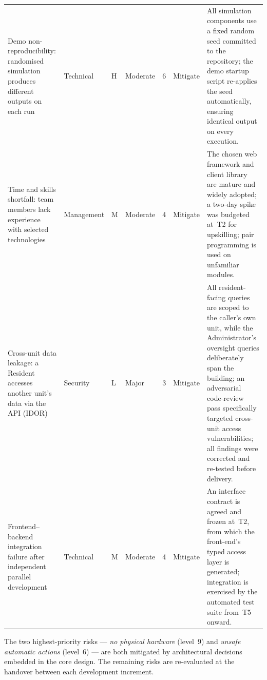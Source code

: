\begin{longtable}{@{} p{2.5cm} p{1.4cm} p{0.7cm} p{1.4cm} p{0.7cm} p{1.5cm} p{4.3cm} @{}}
  Demo non-reproducibility: randomised simulation produces different outputs on each run
    & Technical
    & H
    & Moderate
    & 6
    & Mitigate
    & All simulation components use a fixed random seed committed to the repository; the demo startup script re-applies the seed automatically, ensuring identical output on every execution. \\[4pt]

  Time and skills shortfall: team members lack experience with selected technologies
    & Management
    & M
    & Moderate
    & 4
    & Mitigate
    & The chosen web framework and client library are mature and widely adopted; a two-day spike was budgeted at~T2 for upskilling; pair programming is used on unfamiliar modules. \\[4pt]

  Cross-unit data leakage: a Resident accesses another unit's data via the API (IDOR)
    & Security
    & L
    & Major
    & 3
    & Mitigate
    & All resident-facing queries are scoped to the caller's own unit, while the Administrator's oversight queries deliberately span the building; an adversarial code-review pass specifically targeted cross-unit access vulnerabilities; all findings were corrected and re-tested before delivery. \\[4pt]

  Frontend--backend integration failure after independent parallel development
    & Technical
    & M
    & Moderate
    & 4
    & Mitigate
    & An interface contract is agreed and frozen at~T2, from which the front-end's typed access layer is generated; integration is exercised by the automated test suite from~T5 onward. \\

\end{longtable}

\noindent
The two highest-priority risks --- \emph{no physical hardware} (level~9) and
\emph{unsafe automatic actions} (level~6) --- are both mitigated by architectural
decisions embedded in the core design.  The remaining risks are re-evaluated at
the handover between each development increment.
